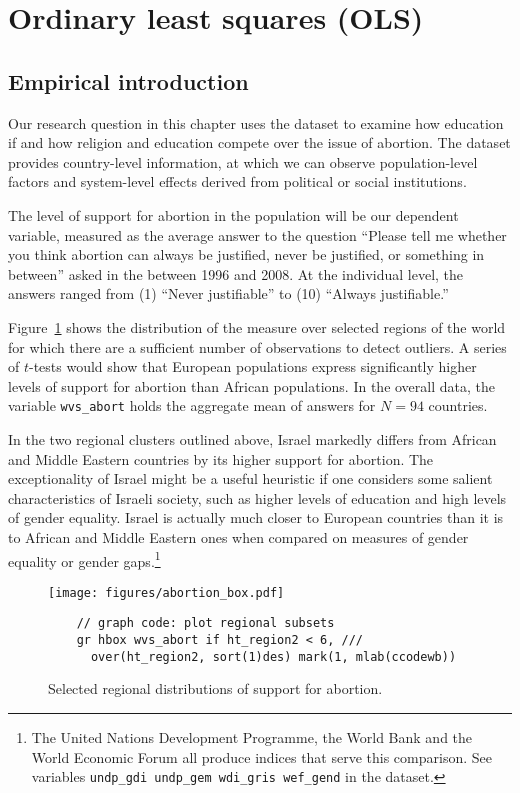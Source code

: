 %
%
%
\section{Ordinary least squares (OLS)}

	\subsection{Empirical introduction}

Our research question in this chapter uses the \QOG{} dataset to examine how education if and how religion and education compete over the issue of abortion. The dataset provides country-level information, at which we can observe population-level factors and system-level effects derived from political or social institutions.

The level of support for abortion in the population will be our dependent variable, measured as the average answer to the question ``Please tell me whether you think abortion can always be justified, never be justified, or something in between'' asked in the \WVS{} between 1996 and 2008. At the individual level, the answers ranged from (1) ``Never justifiable'' to (10) ``Always justifiable.''

Figure~\ref{fig:distr} shows the distribution of the measure over selected regions of the world for which there are a sufficient number of observations to detect outliers. A series of $t$-tests would show that European populations express significantly higher levels of support for abortion than African populations. In the overall \QOG{} data, the variable \texttt{wvs\_abort} holds the aggregate mean of answers for $N = 94$ countries. 

In the two regional clusters outlined above, Israel markedly differs from African and Middle Eastern countries by its higher support for abortion. The exceptionality of Israel might be a useful heuristic if one considers some salient characteristics of Israeli society, such as higher levels of education and high levels of gender equality. Israel is actually much closer to European countries than it is to African and Middle Eastern ones when compared on measures of gender equality or gender gaps.\footnote{\label{fn:gdi_gem} The United Nations Development Programme, the World Bank and the World Economic Forum all produce indices that serve this comparison. See variables \texttt{undp\_gdi undp\_gem wdi\_gris wef\_gend} in the \QOG{} dataset.}

\begin{figure}[htp]
	\centering
	\texttt{[image: figures/abortion\_box.pdf]}

	\caption[Regional distributions of support for abortion]{\label{fig:distr}
	Selected regional distributions of support for abortion.\\
	\mlines{} }

	\begin{verbatim}
	// graph code: plot regional subsets
	gr hbox wvs_abort if ht_region2 < 6, ///
	  over(ht_region2, sort(1)des) mark(1, mlab(ccodewb))
	\end{verbatim}
	
\end{figure}%

